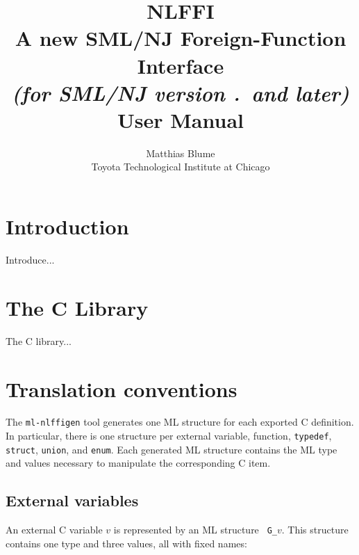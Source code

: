 \documentclass[titlepage,letterpaper]{article}
\author{Matthias Blume \\
Toyota Technological Institute at Chicago}
\title{{\bf NLFFI}\\
A new SML/NJ Foreign-Function Interface \\
{\it\small (for SML/NJ version \smlmj.\smlmn~and later)} \\
User Manual}
\begin{document}


\maketitle

\pagebreak

\tableofcontents

\pagebreak

\section{Introduction}

Introduce...

\section{The C Library}

The C library...

\section{Translation conventions}

The {\tt ml-nlffigen} tool generates one ML structure for each
exported C definition.  In particular, there is one structure per
external variable, function, {\tt typedef}, {\tt struct}, {\tt union},
and {\tt enum}.
Each generated ML structure contains the ML type and values necessary
to manipulate the corresponding C item.

\subsection{External variables}

An external C variable $v$ is represented by an ML structure {\tt
  G\_}$v$.  This structure contains one type and three values, all
with fixed names:
\end{document}

